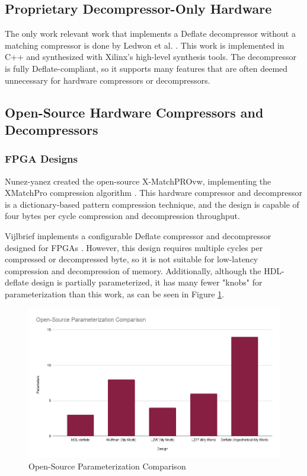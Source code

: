 \documentclass[doublespace,nopageskip]{VTthesis}
\begin{document}
\subsection{Proprietary Decompressor-Only Hardware}\label{proprietary_decompressor-only_hardware}
The only work relevant work that implements a Deflate decompressor without a matching compressor is done by Ledwon et al. \cite{deflatedecompression}. This work is implemented in C++ and synthesized with Xilinx's high-level synthesis tools. The decompressor is fully Deflate-compliant, so it supports many features that are often deemed unnecessary for hardware compressors or decompressors.

\subsection{Open-Source Hardware Compressors and Decompressors}\label{ss:open-source_hardware_compressors_and_decompressors}
\subsubsection{FPGA Designs}\label{sss:fpga_designs}
Nunez-yanez created the open-source X-MatchPROvw, implementing the XMatchPro compression algorithm \cite{xmatchpro}. This hardware compressor and decompressor is a dictionary-based pattern compression technique, and the design is capable of four bytes per cycle compression and decompression throughput.

Vijlbrief implements a configurable Deflate compressor and decompressor designed for FPGAs \cite{hdldeflate}. However, this design requires multiple cycles per compressed or decompressed byte, so it is not suitable for low-latency compression and decompression of memory. Additionally, although the HDL-deflate design is partially parameterized, it has many fewer "knobs" for parameterization than this work, as can be seen in Figure \ref{fig:open-source_parameterization_comparison}.

\begin{figure}[htb]
	\centering
	\includegraphics[scale=0.44]{Open-Source Parameterization Comparison.png}
	\caption{Open-Source Parameterization Comparison}
	\label{fig:open-source_parameterization_comparison}
\end{figure}
\end{document}
